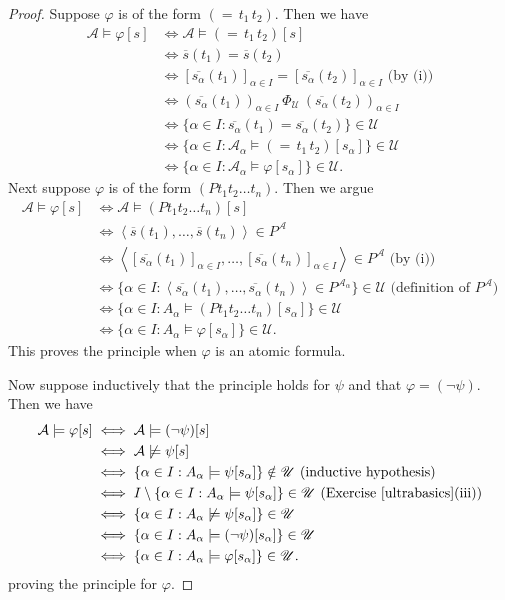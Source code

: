\documentclass{article}
\def\A{\mathcal A}
\def\U{\mathscr U}
\begin{document}
\begin{proof}
Suppose $\varphi$ is of the form $(=\,t_1\,t_2)$.  Then we have
\begin{align*}
\A\models\varphi[s]
&\iff\A\models(=\,t_1\,t_2)[s]\\
&\iff\overline s(t_1)=\overline s(t_2)\\
&\iff[\overline{s_\alpha}(t_1)]_{\alpha\in I}=[\overline{s_\alpha}(t_2)]_{\alpha\in I}\text{ (by (i))}\\
&\iff(\overline{s_\alpha}(t_1))_{\alpha\in I}~\Phi_\U~(\overline{s_\alpha}(t_2))_{\alpha\in I}\\
&\iff\{\alpha\in I:\overline{s_\alpha}(t_1)=\overline{s_\alpha}(t_2)\}\in\U\\
&\iff\{\alpha\in I:\A_\alpha\models(=\,t_1\,t_2)[s_\alpha]\}\in\U\\
&\iff\{\alpha\in I:\A_\alpha\models\varphi[s_\alpha]\}\in\U.
\end{align*}
Next suppose $\varphi$ is of the form $(Pt_1t_2\dots t_n)$.  Then we argue
\begin{align*}
\A\models\varphi[s]
&\iff\A\models(Pt_1t_2\dots t_n)[s]\\
&\iff\left<\overline s(t_1),\dots,\overline s(t_n)\right>\in P^\A\\
&\iff\left<[\overline{s_\alpha}(t_1)]_{\alpha\in I},\dots,[\overline{s_\alpha}(t_n)]_{\alpha\in I}\right>\in P^\A\text{ (by (i))}\\
&\iff\{\alpha\in I:\left<\overline{s_\alpha}(t_1),\dots,\overline{s_\alpha}(t_n)\right>\in P^{\A_\alpha}\}\in\U\text{ (definition of }P^\A\text{)}\\
&\iff\{\alpha\in I:A_\alpha\models(Pt_1t_2\dots t_n)[s_\alpha]\}\in\U\\
&\iff\{\alpha\in I:A_\alpha\models\varphi[s_\alpha]\}\in\U.
\end{align*}
This proves the principle when $\varphi$ is an atomic formula.

Now suppose inductively that the principle holds for $\psi$ and that $\varphi=(\neg\psi)$.  Then we have
\begin{align*}
\A\models\varphi[s]
&\iff\A\models(\neg\psi)[s]\\
&\iff\A\not\models\psi[s]\\
&\iff\{\alpha\in I:A_\alpha\models\psi[s_\alpha]\}\notin\U\text{ (inductive hypothesis)}\\
&\iff I\setminus\{\alpha\in I:A_\alpha\models\psi[s_\alpha]\}\in\U\text{ (Exercise \ref{ultrabasics}(iii))}\\
&\iff\{\alpha\in I:A_\alpha\not\models\psi[s_\alpha]\}\in\U\\
&\iff\{\alpha\in I:A_\alpha\models(\neg\psi)[s_\alpha]\}\in\U\\
&\iff\{\alpha\in I:A_\alpha\models\varphi[s_\alpha]\}\in\U.
\end{align*}
proving the principle for $\varphi$.


\end{proof}
\end{document}
